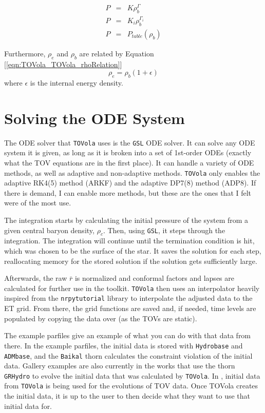 \begin{eqnarray}
    P & = & K\rho_b^{\Gamma} \\
    P & = & K_i\rho_b^{\Gamma_i} \\
    P & = & P_{table}(\rho_b)
\end{eqnarray}

Furthermore, $\rho_e$ and $\rho_b$ are related by Equation [\ref{eqn:TOVola_TOVola_rhoRelation}]
\begin{equation}\label{eqn:TOVola_TOVola_rhoRelation}
\rho_e = \rho_b(1+\epsilon)
\end{equation}
where $\epsilon$ is the internal energy density.

\section{Solving the ODE System}

The ODE solver that \texttt{TOVola} uses is the \texttt{GSL} ODE solver. It can solve any ODE system it is given, as long as it is broken into a set of 1st-order ODEs (exactly what the TOV equations are in the first place). It can handle a variety of ODE methods, as well as adaptive and non-adaptive methods. \texttt{TOVola} only enables the adaptive RK4(5) method (ARKF) and the adaptive DP7(8) method (ADP8). If there is demand, I can enable more methods, but these are the ones that I felt were of the most use.

The integration starts by calculating the initial pressure of the system from a given central baryon density, $\rho_c$. Then, using \texttt{GSL}, it steps through the integration. The integration will continue until the termination condition is hit, which was chosen to be the surface of the star. It saves the solution for each step, reallocating memory for the stored solution if the solution gets sufficiently large.

Afterwards, the raw $\bar{r}$ is normalized and conformal factors and lapses are calculated for further use in the toolkit. \texttt{TOVola} then uses an interpolator heavily inspired from the \texttt{nrpytutorial}\cite{TOVola_TOVola_NRpy} library to interpolate the adjusted data to the ET grid. From there, the grid functions are saved and, if needed, time levels are populated by copying the data over (as the TOVs are static).

The example parfiles give an example of what you can do with that data from there. In the example parfiles, the initial data is stored with \texttt{Hydrobase} and \texttt{ADMbase}, and the \texttt{Baikal} thorn calculates the constraint violation of the initial data. Gallery examples are also currently in the works that use the thorn \texttt{GRHydro} to evolve the initial data that was calculated by \texttt{TOVola}. In \cite{TOVola_TOVola_GRHayL}, initial data from \texttt{TOVola} is being used for the evolutions of TOV data. Once TOVola creates the initial data, it is up to the user to then decide what they want to use that initial data for.

